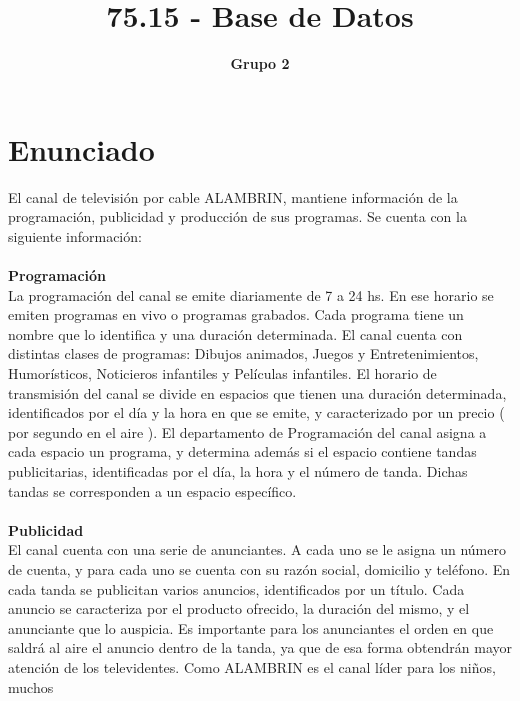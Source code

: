 \documentclass[a4paper,10pt,titlepage]{article}
\title{75.15 - Base de Datos}
\author{\textbf{Grupo 2}}
\begin{document}
\pagestyle{fancy}
\maketitle

\tableofcontents
\newpage

\section{Enunciado}
El canal de televisi\'on por cable ALAMBRIN, mantiene informaci\'on de la programaci\'on, publicidad y producci\'on
de sus programas. Se cuenta con la siguiente informaci\'on:\\
\\ \textbf{Programaci\'on} \\
La programaci\'on del canal se emite diariamente de 7 a 24 hs. En ese horario se emiten programas en vivo o
programas grabados. Cada programa tiene un nombre que lo identifica y una duraci\'on determinada. El canal
cuenta con distintas clases de programas: Dibujos animados, Juegos y Entretenimientos, Humorísticos,
Noticieros infantiles y Películas infantiles.
El horario de transmisi\'on del canal se divide en espacios que tienen una duraci\'on determinada, identificados por
el día y la hora en que se emite, y caracterizado por un precio ( por segundo en el aire ).
El departamento de Programaci\'on del canal asigna a cada espacio un programa, y determina adem\'as si el
espacio contiene tandas publicitarias, identificadas por el día, la hora y el n\'umero de tanda. Dichas tandas se
corresponden a un espacio específico.\\
\\ \textbf{Publicidad}\\
El canal cuenta con una serie de anunciantes. A cada uno se le asigna un n\'umero de cuenta, y para cada uno se
cuenta con su raz\'on social, domicilio y tel\'efono.
En cada tanda se publicitan varios anuncios, identificados por un título. Cada anuncio se caracteriza por el
producto ofrecido, la duraci\'on del mismo, y el anunciante que lo auspicia.
Es importante para los anunciantes el orden en que saldr\'a al aire el anuncio dentro de la tanda, ya que de esa
forma obtendr\'an mayor atenci\'on de los televidentes. Como ALAMBRIN es el canal líder para los niños, muchos
\end{document}

